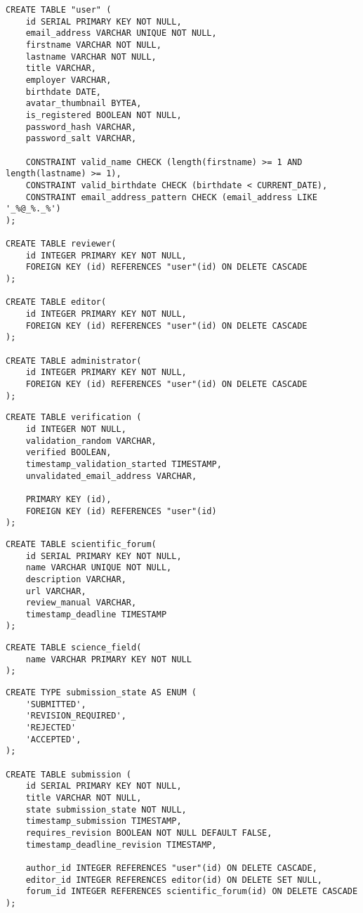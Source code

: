 \begin{lstlisting}[caption={DDL von Nutzern}]
CREATE TABLE "user" (
	id SERIAL PRIMARY KEY NOT NULL,
	email_address VARCHAR UNIQUE NOT NULL,
	firstname VARCHAR NOT NULL,
	lastname VARCHAR NOT NULL,
	title VARCHAR,
	employer VARCHAR,
	birthdate DATE,
	avatar_thumbnail BYTEA,
	is_registered BOOLEAN NOT NULL,
	password_hash VARCHAR,
	password_salt VARCHAR,

	CONSTRAINT valid_name CHECK (length(firstname) >= 1 AND length(lastname) >= 1),
	CONSTRAINT valid_birthdate CHECK (birthdate < CURRENT_DATE),
	CONSTRAINT email_address_pattern CHECK (email_address LIKE '_%@_%._%')
);

CREATE TABLE reviewer(
	id INTEGER PRIMARY KEY NOT NULL,
	FOREIGN KEY (id) REFERENCES "user"(id) ON DELETE CASCADE
);

CREATE TABLE editor(
	id INTEGER PRIMARY KEY NOT NULL,
	FOREIGN KEY (id) REFERENCES "user"(id) ON DELETE CASCADE
);

CREATE TABLE administrator(
	id INTEGER PRIMARY KEY NOT NULL,
	FOREIGN KEY (id) REFERENCES "user"(id) ON DELETE CASCADE
);
\end{lstlisting}

\begin{lstlisting}[caption={DDL von Verifizierung}]
CREATE TABLE verification (
	id INTEGER NOT NULL,
	validation_random VARCHAR,
	verified BOOLEAN,
	timestamp_validation_started TIMESTAMP,
	unvalidated_email_address VARCHAR,

	PRIMARY KEY (id),
	FOREIGN KEY (id) REFERENCES "user"(id)
);
\end{lstlisting}

\begin{lstlisting}[caption={DDL von wissenschaftlichen Foren}]
CREATE TABLE scientific_forum(
	id SERIAL PRIMARY KEY NOT NULL,
	name VARCHAR UNIQUE NOT NULL,
	description VARCHAR,
	url VARCHAR,
	review_manual VARCHAR,
	timestamp_deadline TIMESTAMP
);
\end{lstlisting}

\begin{lstlisting}[caption={DDL von Fachgebieten}]
CREATE TABLE science_field(
	name VARCHAR PRIMARY KEY NOT NULL
);
\end{lstlisting}
\begin{lstlisting}[caption={DDL von Einreichungen}]
CREATE TYPE submission_state AS ENUM (
	'SUBMITTED',
	'REVISION_REQUIRED',
	'REJECTED'
	'ACCEPTED',
);

CREATE TABLE submission (
	id SERIAL PRIMARY KEY NOT NULL,
	title VARCHAR NOT NULL,
	state submission_state NOT NULL,
	timestamp_submission TIMESTAMP,
	requires_revision BOOLEAN NOT NULL DEFAULT FALSE,
	timestamp_deadline_revision TIMESTAMP,

	author_id INTEGER REFERENCES "user"(id) ON DELETE CASCADE,
	editor_id INTEGER REFERENCES editor(id) ON DELETE SET NULL,
	forum_id INTEGER REFERENCES scientific_forum(id) ON DELETE CASCADE
);
\end{lstlisting}

